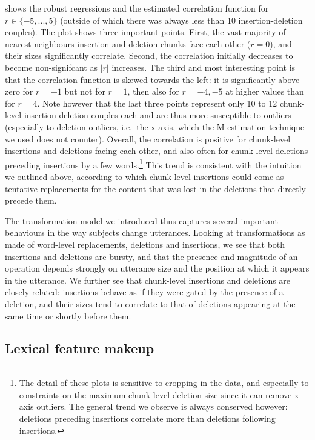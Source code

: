 \documentclass[a4paper,fleqn]{cas-dc}
\begin{document}
 shows the robust regressions and
the estimated correlation function for \(r \in \{ -5, ..., 5 \}\)
(outside of which there was always less than 10 insertion-deletion
couples). The plot shows three important points. First, the vast
majority of nearest neighbours insertion and deletion chunks face each
other (\(r = 0\)), and their sizes significantly correlate. Second, the
correlation initially decreases to become non-signifcant as \(|r|\)
increases. The third and most interesting point is that the correlation
function is skewed towards the left: it is significantly above zero for
\(r = -1\) but not for \(r = 1\), then also for \(r = -4, -5\) at higher
values than for \(r = 4\). Note however that the last three points
represent only 10 to 12 chunk-level insertion-deletion couples each and
are thus more susceptible to outliers (especially to deletion outliers,
i.e.~the x axis, which the M-estimation technique we used does not
counter). Overall, the correlation is positive for chunk-level
insertions and deletions facing each other, and also often for
chunk-level deletions preceding insertions by a few words.\footnote{The
  detail of these plots is sensitive to cropping in the data, and
  especially to constraints on the maximum chunk-level deletion size
  since it can remove x-axis outliers. The general trend we observe is
  always conserved however: deletions preceding insertions correlate
  more than deletions following insertions.} This trend is consistent
with the intuition we outlined above, according to which chunk-level
insertions could come as tentative replacements for the content that was
lost in the deletions that directly precede them.

\bigskip
The transformation model we introduced thus captures several important
behaviours in the way subjects change utterances. Looking at
transformations as made of word-level replacements, deletions and
insertions, we see that both insertions and deletions are bursty, and
that the presence and magnitude of an operation depends strongly on
utterance size and the position at which it appears in the utterance. We
further see that chunk-level insertions and deletions are closely
related: insertions behave as if they were gated by the presence of a
deletion, and their sizes tend to correlate to that of deletions
appearing at the same time or shortly before them.

\subsection{Lexical feature makeup}\label{lexical-feature-makeup}
\end{document}
